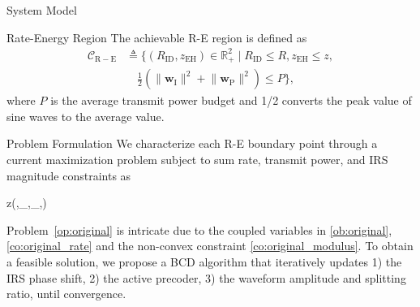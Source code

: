 \documentclass[journal]{IEEEtran}
\begin{document}
\begin{section}{System Model}
		\begin{subsection}{Rate-Energy Region}
			The achievable R-E region is defined as
			\begin{align}
				\mathcal{C}_{\mathrm{R-E}}
				&\triangleq \biggl\{(R_{\mathrm{ID}}, z_{\mathrm{EH}}) \in \mathbb{R}_+^2 \mid R_{\mathrm{ID}} \le R, z_{\mathrm{EH}} \le z,\nonumber\\
				&\quad \frac{1}{2}\left(\lVert{\boldsymbol{w}_{\mathrm{I}}}\rVert^2+\lVert{\boldsymbol{w}_{\mathrm{P}}}\rVert^2\right) \le P\biggr\},
			\end{align}
			where $P$ is the average transmit power budget and \num{1/2} converts the peak value of sine waves to the average value.
		\end{subsection}
	\end{section}


	\begin{section}{Problem Formulation}\label{se:problem_formulation}
		We characterize each R-E boundary point through a current maximization problem subject to sum rate, transmit power, and IRS magnitude constraints as
		\begin{maxi!}
			{}{z(\boldsymbol{\phi},_{},_{},\rho)}{\label{op:original}}{\label{ob:original}}
			\label{co:original_rate}
			\label{co:original_power}
			\label{co:original_modulus}
		\end{maxi!}
		Problem~\eqref{op:original} is intricate due to the coupled variables in \eqref{ob:original}, \eqref{co:original_rate} and the non-convex constraint \eqref{co:original_modulus}. To obtain a feasible solution, we propose a BCD algorithm that iteratively updates 1) the IRS phase shift, 2) the active precoder, 3) the waveform amplitude and splitting ratio, until convergence.



\end{section}
\end{document}
